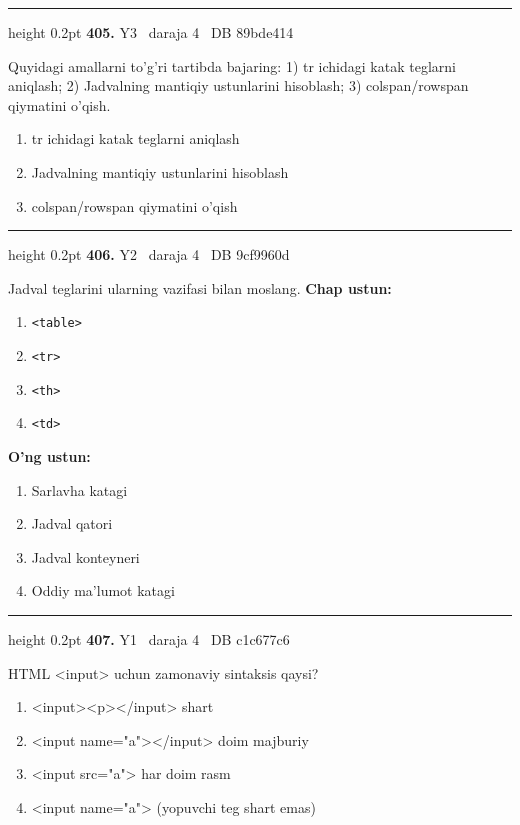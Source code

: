 \documentclass[10pt,a4paper,oneside]{article}
\begin{document}
\vspace{2mm}\hrule height 0.2pt \vspace{4mm}
\hypertarget{q405}{\textbf{\color{ink}405.}}  {\color{muted}\scriptsize Y3 \textbullet\ daraja 4 \textbullet\ DB 89bde414}
\par
Quyidagi amallarni to'g'ri tartibda bajaring: 1) tr ichidagi katak teglarni aniqlash; 2) Jadvalning mantiqiy ustunlarini hisoblash; 3) colspan/rowspan qiymatini o'qish.
\begin{enumerate}[label=\Alph*),leftmargin=9mm]
\item tr ichidagi katak teglarni aniqlash
\item Jadvalning mantiqiy ustunlarini hisoblash
\item colspan/rowspan qiymatini o'qish
\end{enumerate}
\vspace{2mm}\hrule height 0.2pt \vspace{4mm}
\hypertarget{q406}{\textbf{\color{ink}406.}}  {\color{muted}\scriptsize Y2 \textbullet\ daraja 4 \textbullet\ DB 9cf9960d}
\par
Jadval teglarini ularning vazifasi bilan moslang.
\textbf{\footnotesize Chap ustun:}
\begin{enumerate}[label=\arabic*),leftmargin=9mm]
\item \texttt{\textless{}table\textgreater{}}
\item \texttt{\textless{}tr\textgreater{}}
\item \texttt{\textless{}th\textgreater{}}
\item \texttt{\textless{}td\textgreater{}}
\end{enumerate}
\textbf{\footnotesize O'ng ustun:}
\begin{enumerate}[label=\Alph*),leftmargin=9mm]
\item Sarlavha katagi
\item Jadval qatori
\item Jadval konteyneri
\item Oddiy ma'lumot katagi
\end{enumerate}
\vspace{2mm}\hrule height 0.2pt \vspace{4mm}
\hypertarget{q407}{\textbf{\color{ink}407.}}  {\color{muted}\scriptsize Y1 \textbullet\ daraja 4 \textbullet\ DB c1c677c6}
\par
HTML \textless{}input\textgreater{} uchun zamonaviy sintaksis qaysi?
\begin{enumerate}[label=\Alph*),leftmargin=9mm]
\item \textless{}input\textgreater{}\textless{}p\textgreater{}\textless{}/input\textgreater{} shart
\item \textless{}input name="a"\textgreater{}\textless{}/input\textgreater{} doim majburiy
\item \textless{}input src="a"\textgreater{} har doim rasm
\item \textless{}input name="a"\textgreater{} (yopuvchi teg shart emas)
\end{enumerate}
\end{document}

